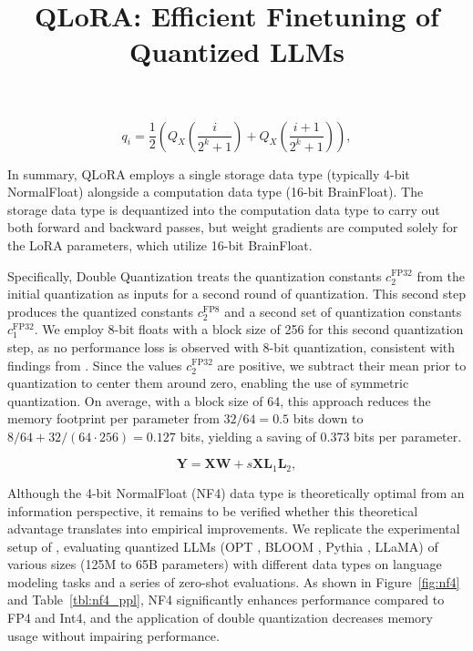 \title{QLoRA: Efficient Finetuning of Quantized LLMs}
\begin{equation}
q_i  = \frac{1}{2}\left( Q_X\left(\frac{i}{2^k+1}\right) + Q_X\left(\frac{i+1}{2^k+1}\right)\right),
\end{equation}

In summary, \textsc{QLoRA} employs a single storage data type (typically 4-bit NormalFloat) alongside a computation data type (16-bit BrainFloat). The storage data type is dequantized into the computation data type to carry out both forward and backward passes, but weight gradients are computed solely for the LoRA parameters, which utilize 16-bit BrainFloat.

Specifically, Double Quantization treats the quantization constants $c_2^{\text{FP32}}$ from the initial quantization as inputs for a second round of quantization. This second step produces the quantized constants $c_2^{\text{FP8}}$ and a second set of quantization constants $c_1^{\text{FP32}}$. We employ 8-bit floats with a block size of 256 for this second quantization step, as no performance loss is observed with 8-bit quantization, consistent with findings from \citet{dettmers2022case}. Since the values $c_2^{\text{FP32}}$ are positive, we subtract their mean prior to quantization to center them around zero, enabling the use of symmetric quantization. On average, with a block size of 64, this approach reduces the memory footprint per parameter from $32/64=0.5$ bits down to $8/64 + 32/(64\cdot256) = 0.127$ bits, yielding a saving of 0.373 bits per parameter.

\begin{equation}
    \mathbf{Y} = \mathbf{X}\mathbf{W} + s\mathbf{X}\mathbf{L}_1\mathbf{L}_2,
\end{equation}

Although the 4-bit NormalFloat (NF4) data type is theoretically optimal from an information perspective, it remains to be verified whether this theoretical advantage translates into empirical improvements. We replicate the experimental setup of \citet{dettmers2022case}, evaluating quantized LLMs (OPT \citep{zhang2022opt}, BLOOM \cite{scao2022bloom}, Pythia \cite{biderman2023pythia}, LLaMA) of various sizes (125M to 65B parameters) with different data types on language modeling tasks and a series of zero-shot evaluations. As shown in Figure~\ref{fig:nf4} and Table~\ref{tbl:nf4_ppl}, NF4 significantly enhances performance compared to FP4 and Int4, and the application of double quantization decreases memory usage without impairing performance.

